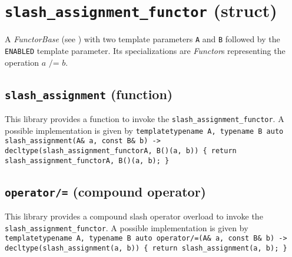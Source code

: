 %
%
%
%
%
%
%

\section{\texttt{slash\_assignment\_functor} (struct)}
A \textit{FunctorBase} (see \cite{functors}) with two template parameters \texttt{A} and \texttt{B} followed by the \texttt{ENABLED} template parameter.
Its specializations are \textit{Functor}s representing the operation $\textit{a /= b}$.

\subsection{\texttt{slash\_assignment} (function)}
This library provides a function to invoke the \texttt{slash\_assignment\_functor}.
A possible implementation is given by\newline
\texttt{template\textlangle typename A, typename B\textrangle\newline
auto\newline
slash\_assignment(A\& a, const B\& b)\newline
-> decltype(slash\_assignment\_functor\textlangle A, B\textrangle()(a, b))\newline
\{ return slash\_assignment\_functor\textlangle A, B\textrangle()(a, b); \}}

\subsection{\texttt{operator/=} (compound operator)}
This library provides a compound slash operator overload to invoke the \texttt{slash\_assignment\_functor}.
A possible implementation is given by\newline
\texttt{template\textlangle typename A, typename B\textrangle\newline
auto\newline
operator/=(A\& a, const B\& b)\newline
-> decltype(slash\_assignment(a, b))\newline
\{ return slash\_assignment(a, b); \}}
